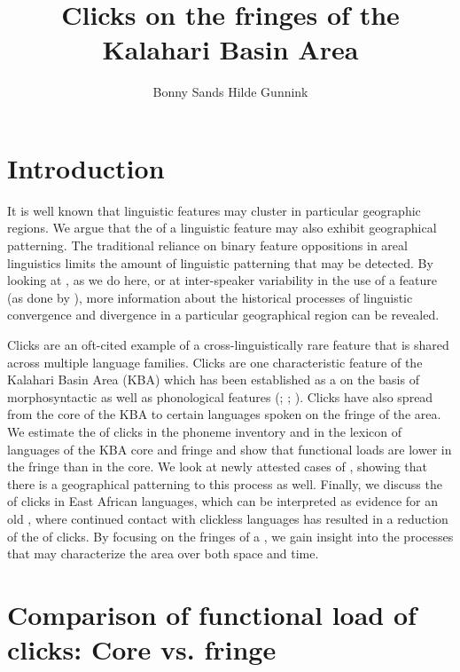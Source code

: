\documentclass[output=paper,newtxmath,modfonts,nonflat,draftmode]{langsci/langscibook}
\title{Clicks on the fringes of the Kalahari Basin Area}
\author{Bonny Sands\affiliation{Northern Arizona University} \lastand Hilde Gunnink\affiliation{Ghent University}}
\begin{document}
\maketitle

\section{Introduction}\label{sec:sands:1}

It is well known that linguistic features may cluster in particular geographic regions. We argue that the  of a linguistic feature may also exhibit geographical patterning. The traditional reliance on binary feature oppositions in areal linguistics limits the amount of linguistic patterning that may be detected. By looking at , as we do here, or at inter-speaker variability in the use of a feature (as done by \citealt{Kulkarni-Joshi2016}), more information about the historical processes of linguistic convergence and divergence in a particular geographical region can be revealed. 

Clicks are an oft-cited example of a cross-linguistically rare feature that is shared across multiple language families. Clicks are one characteristic feature of the Kalahari Basin Area (KBA) which has been established as a  on the basis of morphosyntactic as well as phonological features (\citealt{Güldemann1998}; \citeyear{güldemann2013}; \citealt{naumann2015}). Clicks have also spread from the core of the KBA to certain languages spoken on the fringe of the area. We estimate the  of clicks in the phoneme inventory and in the lexicon of languages of the KBA core and fringe and show that functional loads are lower in the fringe than in the core. We look at newly attested cases of , showing that there is a geographical patterning to this process as well. Finally, we discuss the  of clicks in East African languages, which can be interpreted as evidence for an old , where continued contact with clickless languages has resulted in a reduction of the  of clicks. By focusing on the fringes of a , we gain insight into the processes that may characterize the area over both space and time. 

\section{Comparison of functional load of clicks: Core vs. fringe}\label{sec:sands:2}
\end{document}
